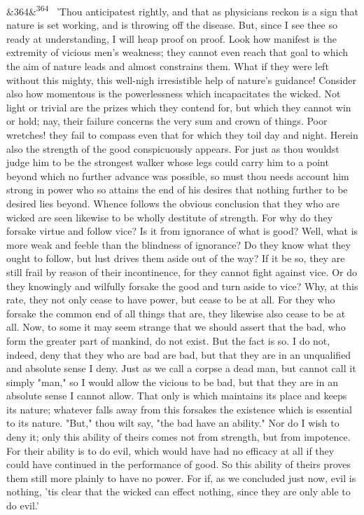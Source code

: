 \documentclass[12pt]{article}
\newcommand{\para}[1][]{\par\noindent\ifx&#1&\else\textsuperscript{\footnotesize #1}~\fi}
\begin{document}
\para[364] 'Thou anticipatest rightly, and that as physicians reckon is a sign that nature is set working, and is throwing off the disease. But, since I see thee so ready at understanding, I will heap proof on proof. Look how manifest is the extremity of vicious men's weakness; they cannot even reach that goal to which the aim of nature leads and almost constrains them. What if they were left without this mighty, this well-nigh irresistible help of nature's guidance! Consider also how momentous is the powerlessness which incapacitates the wicked. Not light or trivial are the prizes which they contend for, but which they cannot win or hold; nay, their failure concerns the very sum and crown of things. Poor wretches! they fail to compass even that for which they toil day and night. Herein also the strength of the good conspicuously appears. For just as thou wouldst judge him to be the strongest walker whose legs could carry him to a point beyond which no further advance was possible, so must thou needs account him strong in power who so attains the end of his desires that nothing further to be desired lies beyond. Whence follows the obvious conclusion that they who are wicked are seen likewise to be wholly destitute of strength. For why do they forsake virtue and follow vice? Is it from ignorance of what is good? Well, what is more weak and feeble than the blindness of ignorance? Do they know what they ought to follow, but lust drives them aside out of the way? If it be so, they are still frail by reason of their incontinence, for they cannot fight against vice. Or do they knowingly and wilfully forsake the good and turn aside to vice? Why, at this rate, they not only cease to have power, but cease to be at all. For they who forsake the common end of all things that are, they likewise also cease to be at all. Now, to some it may seem strange that we should assert that the bad, who form the greater part of mankind, do not exist. But the fact is so. I do not, indeed, deny that they who are bad are bad, but that they are in an unqualified and absolute sense I deny. Just as we call a corpse a dead man, but cannot call it simply "man," so I would allow the vicious to be bad, but that they are in an absolute sense I cannot allow. That only is which maintains its place and keeps its nature; whatever falls away from this forsakes the existence which is essential to its nature. "But," thou wilt say, "the bad have an ability." Nor do I wish to deny it; only this ability of theirs comes not from strength, but from impotence. For their ability is to do evil, which would have had no efficacy at all if they could have continued in the performance of good. So this ability of theirs proves them still more plainly to have no power. For if, as we concluded just now, evil is nothing, 'tis clear that the wicked can effect nothing, since they are only able to do evil.'
\end{document}
